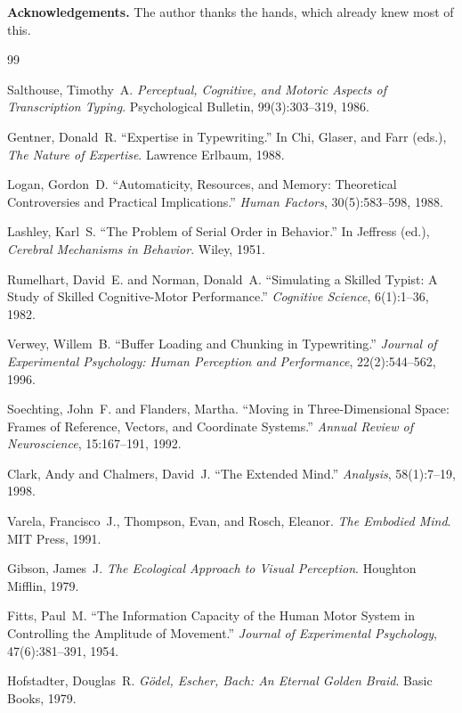 \documentclass[12pt,a4paper]{article}
\theoremstyle{plain}
\theoremstyle{definition}
\theoremstyle{remark}
\begin{document}
\bigskip

\noindent\textbf{Acknowledgements.} The author thanks the hands, which already
knew most of this.

\begin{thebibliography}{99}

Salthouse, Timothy~A.
\textit{Perceptual, Cognitive, and Motoric Aspects of Transcription Typing}.
Psychological Bulletin, 99(3):303--319, 1986.

Gentner, Donald~R.
``Expertise in Typewriting.''
In Chi, Glaser, and Farr (eds.), \textit{The Nature of Expertise}.
Lawrence Erlbaum, 1988.

Logan, Gordon~D.
``Automaticity, Resources, and Memory: Theoretical Controversies and Practical
Implications.''
\textit{Human Factors}, 30(5):583--598, 1988.

Lashley, Karl~S.
``The Problem of Serial Order in Behavior.''
In Jeffress (ed.), \textit{Cerebral Mechanisms in Behavior}.
Wiley, 1951.

Rumelhart, David~E. and Norman, Donald~A.
``Simulating a Skilled Typist: A Study of Skilled Cognitive-Motor Performance.''
\textit{Cognitive Science}, 6(1):1--36, 1982.

Verwey, Willem~B.
``Buffer Loading and Chunking in Typewriting.''
\textit{Journal of Experimental Psychology: Human Perception and Performance},
22(2):544--562, 1996.

Soechting, John~F. and Flanders, Martha.
``Moving in Three-Dimensional Space: Frames of Reference, Vectors, and
Coordinate Systems.''
\textit{Annual Review of Neuroscience}, 15:167--191, 1992.

Clark, Andy and Chalmers, David~J.
``The Extended Mind.''
\textit{Analysis}, 58(1):7--19, 1998.

Varela, Francisco~J., Thompson, Evan, and Rosch, Eleanor.
\textit{The Embodied Mind}.
MIT Press, 1991.

Gibson, James~J.
\textit{The Ecological Approach to Visual Perception}.
Houghton Mifflin, 1979.

Fitts, Paul~M.
``The Information Capacity of the Human Motor System in Controlling the
Amplitude of Movement.''
\textit{Journal of Experimental Psychology}, 47(6):381--391, 1954.

Hofstadter, Douglas~R.
\textit{G\"{o}del, Escher, Bach: An Eternal Golden Braid}.
Basic Books, 1979.


\end{thebibliography}
\end{document}
